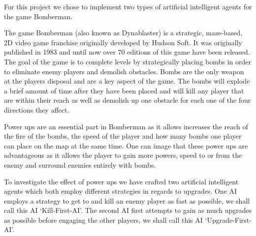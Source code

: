% 
For this project we chose to implement two types of artificial intelligent agents for the game Bomberman.

The game Bomberman (also known as Dynablaster) is a strategic, maze-based, 2D video game franchise originally developed by Hudson Soft. It was originally published in 1983 and until now over 70 editions of this game have been released. 
The goal of the game is to complete levels by strategically placing bombs in order to eliminate enemy players and demolish obstacles. 
Bombs are the only weapon at the players disposal and are a key aspect of the game. The bombs will explode a brief amount of time after they have been placed and will kill any player that are within their reach as well as demolish up one obstacle for each one of the four directions they affect. 

Power ups are an essential part in Bomberman as it allows increases the reach of the fire of the bombs, the speed of the player and how many bombs one player can place on the map at the same time. One can image that these power ups are advantageous as it allows the player to gain more powers, speed to or from the enemy and surround enemies entirely with bombs.

To investigate the effect of power ups we have crafted two artificial intelligent agents which both employ different strategies in regards to upgrades. One AI employs a strategy to get to and kill an enemy player as fast as possible, we shall call this AI `Kill-First-AI'. The second AI first attempts to gain as much upgrades as possible before engaging the other players, we shall call this AI `Upgrade-First-AI'.
